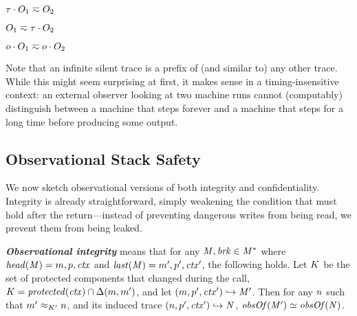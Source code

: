 \documentclass[acmsmall,review,anonymous]{acmart}\settopmatter{printfolios=true,printccs=false,printacmref=false}
\begin{document}
{\begin{minipage}{.2\textwidth}
  \judgment{}{\(\obsT \eqsim \obsT\)}
\end{minipage}
\begin{minipage}{.2\textwidth}
           {\(\tau \cdot O_1 \eqsim O_2\)}
\end{minipage}
\begin{minipage}{.2\textwidth}
           {\(O_1 \eqsim \tau \cdot O_2\)}
\end{minipage}
\begin{minipage}{.2\textwidth}
           {\(o \cdot O_1 \eqsim o \cdot O_2\)}
\end{minipage}


Note that an infinite silent trace is a
prefix of (and similar to) any other trace. While this might seem
surprising at first, it makes sense in a timing-insensitive context:
an external observer looking at two machine runs cannot (computably)
distinguish between a machine that steps forever and a machine that
steps for a long time before producing some output.

\subsection{Observational Stack Safety}

We now sketch observational versions of both integrity and confidentiality.
Integrity is already straightforward, simply weakening the condition that must hold
after the return---instead of preventing dangerous writes from being read, we
prevent them from being leaked.

\textbf{\em Observational integrity} means that for any \(\mathit{M},\mathit{brk} \in \mathit{M}^*\)
where \(\mathit{head}(\mathit{M}) = m,p,\mathit{ctx}\) and \(\mathit{last}(\mathit{M}) = m',p',\mathit{ctx}'\),
the following holds. Let \(K\) be the set of protected components that changed during
the call, \(K = \mathit{protected}(\mathit{ctx}) \cap \Delta(m, m')\),
and let \((m,p',\mathit{ctx}') \hookrightarrow \mathit{M}'\).
Then for any \(n\) such that
\(m' \approx_{K'} n\), and its induced trace
\((n,p',\mathit{ctx}') \hookrightarrow \mathit{N}\), \(\mathit{obsOf}(\mathit{M}') \simeq \mathit{obsOf}(\mathit{N})\).

}
\end{document}

